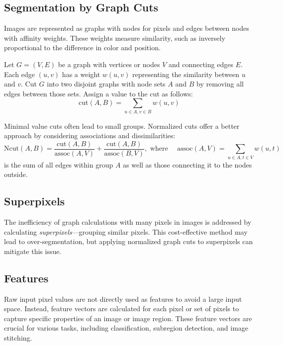 \subsection{Segmentation by Graph Cuts}

Images are represented as graphs with nodes for pixels and edges between nodes with affinity weights.
These weights measure similarity, such as inversely proportional to the difference in color and position.

\begin{definition}
	Let $G=(V,E)$ be a graph with vertices or nodes $V$ and connecting edges $E$. Each edge $(u,v)$ has a weight $w(u,v)$ representing the similarity between $u$ and $v$.
	Cut $G$ into two disjoint graphs with node sets $A$ and $B$ by removing all edges between those sets.
	Assign a value to the cut as follows:
	\[
	\text{cut}(A,B) = \sum_{u\in A,v\in B} w(u,v)
	\]
\end{definition}

Minimal value cuts often lead to small groups. Normalized cuts offer a better approach by considering associations and dissimilarities:
\[\text{Ncut}(A,B) = \frac{\text{cut}(A,B)}{\text{assoc}(A,V)} + \frac{\text{cut}(A,B)}{\text{assoc}(B,V)},
\text{ where } \quad \text{assoc}(A,V) = \sum_{u\in A,t\in V} w(u,t)\]
is the sum of all edges within group $A$ as well as those connecting it to the nodes outside.


\subsection{Superpixels}

The inefficiency of graph calculations with many pixels in images is addressed by calculating \emph{superpixels}—grouping similar pixels.
This cost-effective method may lead to over-segmentation, but applying normalized graph cuts to superpixels can mitigate this issue.

\subsection{Features}

Raw input pixel values are not directly used as features to avoid a large input space.
Instead, feature vectors are calculated for each pixel or set of pixels to capture specific properties of an image or image region.
These feature vectors are crucial for various tasks, including classification, subregion detection, and image stitching.


